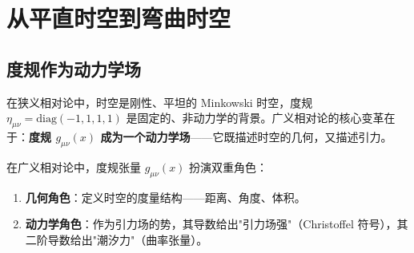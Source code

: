 \section{从平直时空到弯曲时空}

\subsection{度规作为动力学场}

在狭义相对论中，时空是刚性、平坦的 Minkowski 时空，度规 $\eta_{\mu\nu} = \mathrm{diag}(-1,1,1,1)$ 是固定的、非动力学的背景。广义相对论的核心变革在于：\textbf{度规 $g_{\mu\nu}(x)$ 成为一个动力学场}——它既描述时空的几何，又描述引力。

\begin{definition}[度规的动力学角色]
在广义相对论中，度规张量 $g_{\mu\nu}(x)$ 扮演双重角色：
\begin{enumerate}
    \item \textbf{几何角色}：定义时空的度量结构——距离、角度、体积。
    \item \textbf{动力学角色}：作为引力场的势，其导数给出"引力场强"（Christoffel 符号），其二阶导数给出"潮汐力"（曲率张量）。
\end{enumerate}
\end{definition}

